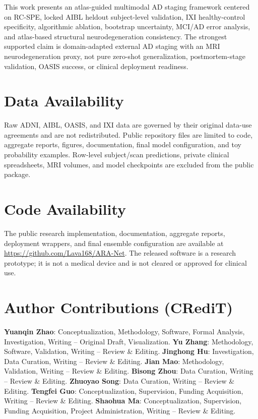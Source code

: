 \documentclass[12pt,a4paper]{article}
\begin{document}
This work presents an atlas-guided multimodal AD staging framework centered on RC-SPE, locked AIBL heldout subject-level validation, IXI healthy-control specificity, algorithmic ablation, bootstrap uncertainty, MCI/AD error analysis, and atlas-based structural neurodegeneration consistency. The strongest supported claim is domain-adapted external AD staging with an MRI neurodegeneration proxy, not pure zero-shot generalization, postmortem-stage validation, OASIS success, or clinical deployment readiness.



\section*{Data Availability}
Raw ADNI, AIBL, OASIS, and IXI data are governed by their original data-use agreements and are not redistributed. Public repository files are limited to code, aggregate reports, figures, documentation, final model configuration, and toy probability examples. Row-level subject/scan predictions, private clinical spreadsheets, MRI volumes, and model checkpoints are excluded from the public package.

\section*{Code Availability}
The public research implementation, documentation, aggregate reports, deployment wrappers, and final ensemble configuration are available at \url{https://github.com/Lava168/ARA-Net}. The released software is a research prototype; it is not a medical device and is not cleared or approved for clinical use.
\section*{Author Contributions (CRediT)}
\textbf{Yuanqin Zhao}: Conceptualization, Methodology, Software, Formal Analysis, Investigation, Writing -- Original Draft, Visualization.
\textbf{Yu Zhang}: Methodology, Software, Validation, Writing -- Review \& Editing.
\textbf{Jinghong Hu}: Investigation, Data Curation, Writing -- Review \& Editing.
\textbf{Jian Mao}: Methodology, Validation, Writing -- Review \& Editing.
\textbf{Bisong Zhou}: Data Curation, Writing -- Review \& Editing.
\textbf{Zhuoyao Song}: Data Curation, Writing -- Review \& Editing.
\textbf{Tengfei Guo}: Conceptualization, Supervision, Funding Acquisition, Writing -- Review \& Editing.
\textbf{Shaohua Ma}: Conceptualization, Supervision, Funding Acquisition, Project Administration, Writing -- Review \& Editing.
\end{document}
